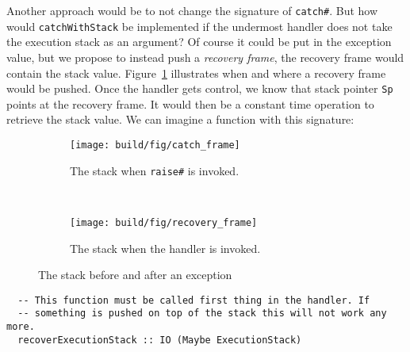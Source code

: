 Another approach would be to not change the signature of
\texttt{catch\#}. But how would \texttt{catchWithStack} be implemented if
the undermost handler does not take the execution stack as an argument?
Of course it could be put in the exception value, but we propose to
instead push a \emph{recovery frame}, the recovery frame would contain
the stack value. Figure~\ref{fig:recovery_frame} illustrates when and
where a recovery frame would be pushed. Once the handler
gets control, we know that stack pointer \texttt{Sp} points
at the recovery frame. It would then be a constant time operation to
retrieve the stack value. We can imagine a function with this
signature:

\begin{figure}
\begin{mdframed}
  \begin{subfigure}[t]{0.5\textwidth}
    \texttt{[image: build/fig/catch\_frame]}
    \caption{The stack when \texttt{raise\#} is invoked.}
  \end{subfigure}
        ~ %
  \begin{subfigure}[t]{0.5\textwidth}
    \texttt{[image: build/fig/recovery\_frame]}
    \caption{The stack when the handler is invoked.}
  \end{subfigure}
  \caption{The stack before and after an exception}
  \label{fig:recovery_frame}
\end{mdframed}
\end{figure}

%
%

\begin{verbatim}
  -- This function must be called first thing in the handler. If
  -- something is pushed on top of the stack this will not work any more.
  recoverExecutionStack :: IO (Maybe ExecutionStack)
\end{verbatim}

